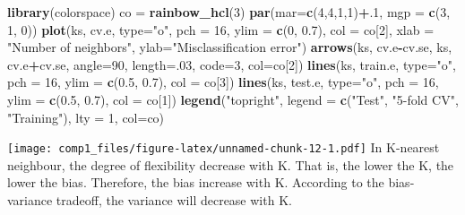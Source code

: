 \documentclass[]{article}
\newenvironment{Shaded}{\begin{snugshade}}{\end{snugshade}}
\newcommand{\KeywordTok}[1]{\textcolor[rgb]{0.13,0.29,0.53}{\textbf{#1}}}
\newcommand{\DataTypeTok}[1]{\textcolor[rgb]{0.13,0.29,0.53}{#1}}
\newcommand{\DecValTok}[1]{\textcolor[rgb]{0.00,0.00,0.81}{#1}}
\newcommand{\FloatTok}[1]{\textcolor[rgb]{0.00,0.00,0.81}{#1}}
\newcommand{\StringTok}[1]{\textcolor[rgb]{0.31,0.60,0.02}{#1}}
\newcommand{\OperatorTok}[1]{\textcolor[rgb]{0.81,0.36,0.00}{\textbf{#1}}}
\newcommand{\NormalTok}[1]{#1}
\begin{document}
\begin{Shaded}
\begin{Highlighting}[]
\KeywordTok{library}\NormalTok{(colorspace)}
\NormalTok{co =}\StringTok{ }\KeywordTok{rainbow_hcl}\NormalTok{(}\DecValTok{3}\NormalTok{)}
\KeywordTok{par}\NormalTok{(}\DataTypeTok{mar=}\KeywordTok{c}\NormalTok{(}\DecValTok{4}\NormalTok{,}\DecValTok{4}\NormalTok{,}\DecValTok{1}\NormalTok{,}\DecValTok{1}\NormalTok{)}\OperatorTok{+}\NormalTok{.}\DecValTok{1}\NormalTok{, }\DataTypeTok{mgp =} \KeywordTok{c}\NormalTok{(}\DecValTok{3}\NormalTok{, }\DecValTok{1}\NormalTok{, }\DecValTok{0}\NormalTok{))}
\KeywordTok{plot}\NormalTok{(ks, cv.e, }\DataTypeTok{type=}\StringTok{"o"}\NormalTok{, }\DataTypeTok{pch =} \DecValTok{16}\NormalTok{, }\DataTypeTok{ylim =} \KeywordTok{c}\NormalTok{(}\DecValTok{0}\NormalTok{, }\FloatTok{0.7}\NormalTok{), }\DataTypeTok{col =}\NormalTok{ co[}\DecValTok{2}\NormalTok{],}
     \DataTypeTok{xlab =} \StringTok{"Number of neighbors"}\NormalTok{, }\DataTypeTok{ylab=}\StringTok{"Misclassification error"}\NormalTok{)}
\KeywordTok{arrows}\NormalTok{(ks, cv.e}\OperatorTok{-}\NormalTok{cv.se, ks, cv.e}\OperatorTok{+}\NormalTok{cv.se, }\DataTypeTok{angle=}\DecValTok{90}\NormalTok{, }\DataTypeTok{length=}\NormalTok{.}\DecValTok{03}\NormalTok{, }\DataTypeTok{code=}\DecValTok{3}\NormalTok{, }\DataTypeTok{col=}\NormalTok{co[}\DecValTok{2}\NormalTok{])}
\KeywordTok{lines}\NormalTok{(ks, train.e, }\DataTypeTok{type=}\StringTok{"o"}\NormalTok{, }\DataTypeTok{pch =} \DecValTok{16}\NormalTok{, }\DataTypeTok{ylim =} \KeywordTok{c}\NormalTok{(}\FloatTok{0.5}\NormalTok{, }\FloatTok{0.7}\NormalTok{), }\DataTypeTok{col =}\NormalTok{ co[}\DecValTok{3}\NormalTok{])}
\KeywordTok{lines}\NormalTok{(ks, test.e, }\DataTypeTok{type=}\StringTok{"o"}\NormalTok{, }\DataTypeTok{pch =} \DecValTok{16}\NormalTok{, }\DataTypeTok{ylim =} \KeywordTok{c}\NormalTok{(}\FloatTok{0.5}\NormalTok{, }\FloatTok{0.7}\NormalTok{), }\DataTypeTok{col =}\NormalTok{ co[}\DecValTok{1}\NormalTok{])}
\KeywordTok{legend}\NormalTok{(}\StringTok{"topright"}\NormalTok{, }\DataTypeTok{legend =} \KeywordTok{c}\NormalTok{(}\StringTok{"Test"}\NormalTok{, }\StringTok{"5-fold CV"}\NormalTok{, }\StringTok{"Training"}\NormalTok{), }\DataTypeTok{lty =} \DecValTok{1}\NormalTok{, }\DataTypeTok{col=}\NormalTok{co)}
\end{Highlighting}
\end{Shaded}

\texttt{[image: comp1\_files/figure-latex/unnamed-chunk-12-1.pdf]} In
K-nearest neighbour, the degree of flexibility decrease with K. That is,
the lower the K, the lower the bias. Therefore, the bias increase with
K. According to the bias-variance tradeoff, the variance will decrease
with K.
\end{document}
